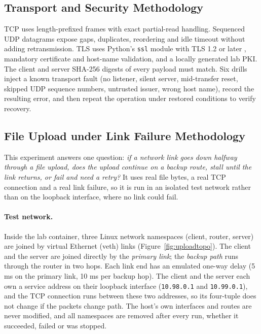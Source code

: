 \documentclass[12pt,a4paper]{report}
\numberwithin{equation}{chapter}
\begin{document}
\subsection{Transport and Security Methodology}
TCP uses length-prefixed frames with exact partial-read handling. Sequenced UDP datagrams expose gaps, duplicates, reordering and idle timeout without adding retransmission. TLS uses Python's \texttt{ssl} module \cite{python_ssl} with TLS 1.2 or later \cite{tls13}, mandatory certificate and host-name validation, and a locally generated lab PKI. The client and server SHA-256 digests \cite{sha} of every payload must match. Six drills inject a known transport fault (no listener, silent server, mid-transfer reset, skipped UDP sequence numbers, untrusted issuer, wrong host name), record the resulting error, and then repeat the operation under restored conditions to verify recovery.

\subsection{File Upload under Link Failure Methodology}\label{sec:uploadmethod}
This experiment answers one question: \emph{if a network link goes down halfway through a file upload, does the upload continue on a backup route, stall until the link returns, or fail and need a retry?} It uses real file bytes, a real TCP connection and a real link failure, so it is run in an isolated test network rather than on the loopback interface, where no link could fail.

\paragraph{Test network.} Inside the lab container, three Linux network namespaces (client, router, server) are joined by virtual Ethernet (veth) links (Figure~\ref{fig:uploadtopo}). The client and the server are joined directly by the \emph{primary link}; the \emph{backup path} runs through the router in two hops. Each link end has an emulated one-way delay (5 ms on the primary link, 10 ms per backup hop). The client and the server each own a service address on their loopback interface (\texttt{10.98.0.1} and \texttt{10.99.0.1}), and the TCP connection runs between these two addresses, so its four-tuple does not change if the packets change path. The host's own interfaces and routes are never modified, and all namespaces are removed after every run, whether it succeeded, failed or was stopped.
\end{document}
